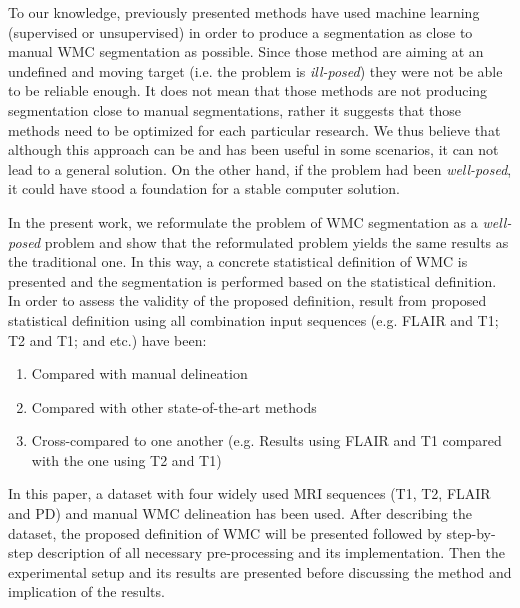 To our knowledge, previously presented methods have used machine learning (supervised or unsupervised) in order to produce a segmentation as close to manual WMC segmentation as possible. Since those method are aiming at an undefined and moving target (i.e. the problem is \textit{ill-posed}) they were not be able to be reliable enough. It does not mean that those methods are not producing segmentation close to manual segmentations, rather it suggests that those methods need to be optimized for each particular research. We thus believe that although this approach can be and has been useful in some scenarios, it can not lead to a general solution. On the other hand, if the problem had been \textit{well-posed}, it could have stood a foundation for a stable computer solution.

In the present work, we reformulate the problem of WMC segmentation as a \textit{well-posed} problem and show that the reformulated problem yields the same results as the traditional one. In this way, a concrete statistical definition of WMC is presented and the segmentation is performed based on the statistical definition. In order to assess the validity of the proposed definition, result from proposed statistical definition using all combination input sequences (e.g. FLAIR and T1; T2 and T1; and etc.) have been:

\begin{enumerate}
\item Compared with manual delineation
\item Compared with other state-of-the-art methods
\item Cross-compared to one another (e.g. Results using FLAIR and T1 compared with the one using T2 and T1)
\end{enumerate}

In this paper, a dataset with four widely used MRI sequences (T1, T2, FLAIR and PD) and manual WMC delineation has been used. After describing the dataset, the proposed definition of WMC will be presented followed by step-by-step description of all necessary pre-processing and its implementation. Then the experimental setup and its results are presented before discussing the method and implication of the results.

  
  
  
  
  
  
  